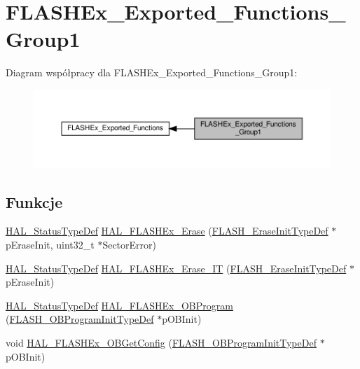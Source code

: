 \hypertarget{group___f_l_a_s_h_ex___exported___functions___group1}{}\section{F\+L\+A\+S\+H\+Ex\+\_\+\+Exported\+\_\+\+Functions\+\_\+\+Group1}
\label{group___f_l_a_s_h_ex___exported___functions___group1}
Diagram współpracy dla F\+L\+A\+S\+H\+Ex\+\_\+\+Exported\+\_\+\+Functions\+\_\+\+Group1\+:\nopagebreak
\begin{figure}[H]
\begin{center}
\leavevmode
\includegraphics[width=350pt]{group___f_l_a_s_h_ex___exported___functions___group1}
\end{center}
\end{figure}
\subsection*{Funkcje}
\begin{DoxyCompactItemize}
\item 
\hyperlink{stm32f4xx__hal__def_8h_a63c0679d1cb8b8c684fbb0632743478f}{H\+A\+L\+\_\+\+Status\+Type\+Def} \hyperlink{group___f_l_a_s_h_ex___exported___functions___group1_ga3e998fdfd05d4073fb9af251ad649531}{H\+A\+L\+\_\+\+F\+L\+A\+S\+H\+Ex\+\_\+\+Erase} (\hyperlink{struct_f_l_a_s_h___erase_init_type_def}{F\+L\+A\+S\+H\+\_\+\+Erase\+Init\+Type\+Def} $\ast$p\+Erase\+Init, uint32\+\_\+t $\ast$Sector\+Error)
\item 
\hyperlink{stm32f4xx__hal__def_8h_a63c0679d1cb8b8c684fbb0632743478f}{H\+A\+L\+\_\+\+Status\+Type\+Def} \hyperlink{group___f_l_a_s_h_ex___exported___functions___group1_gaf58c6764859e4febc21abe462dfb2615}{H\+A\+L\+\_\+\+F\+L\+A\+S\+H\+Ex\+\_\+\+Erase\+\_\+\+IT} (\hyperlink{struct_f_l_a_s_h___erase_init_type_def}{F\+L\+A\+S\+H\+\_\+\+Erase\+Init\+Type\+Def} $\ast$p\+Erase\+Init)
\item 
\hyperlink{stm32f4xx__hal__def_8h_a63c0679d1cb8b8c684fbb0632743478f}{H\+A\+L\+\_\+\+Status\+Type\+Def} \hyperlink{group___f_l_a_s_h_ex___exported___functions___group1_ga001dd4a8defa9eb24a17c4df5953a41d}{H\+A\+L\+\_\+\+F\+L\+A\+S\+H\+Ex\+\_\+\+O\+B\+Program} (\hyperlink{struct_f_l_a_s_h___o_b_program_init_type_def}{F\+L\+A\+S\+H\+\_\+\+O\+B\+Program\+Init\+Type\+Def} $\ast$p\+O\+B\+Init)
\item 
void \hyperlink{group___f_l_a_s_h_ex___exported___functions___group1_ga6d45d5442b8147533b1100ec40fe75d7}{H\+A\+L\+\_\+\+F\+L\+A\+S\+H\+Ex\+\_\+\+O\+B\+Get\+Config} (\hyperlink{struct_f_l_a_s_h___o_b_program_init_type_def}{F\+L\+A\+S\+H\+\_\+\+O\+B\+Program\+Init\+Type\+Def} $\ast$p\+O\+B\+Init)
\end{DoxyCompactItemize}


